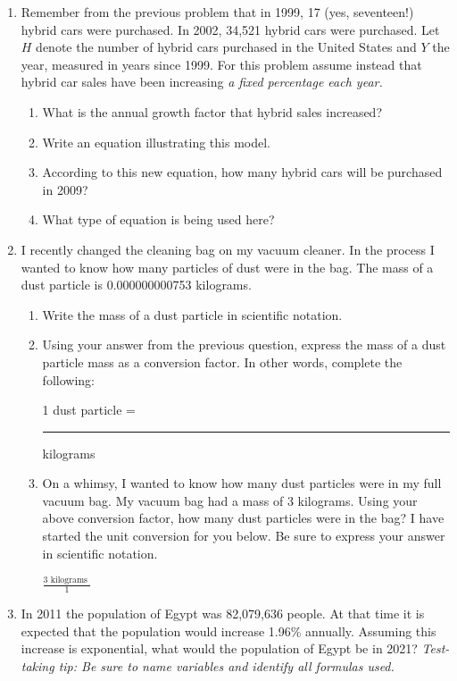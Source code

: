 \documentclass[12pt]{article}
\begin{document}
\begin{enumerate}
\newpage
\item  Remember from the previous problem that in 1999, 17 (yes, seventeen!) hybrid cars were purchased.  In 2002, 34,521 hybrid cars were purchased. Let $H$ denote the number of hybrid cars purchased in the United States and $Y$ the year, measured in years since 1999.  For this problem assume instead that hybrid car sales have been increasing \textit{a fixed percentage each year.}

\begin{enumerate}
\item What is the annual growth factor that hybrid sales increased?  
\vfill
\item Write an equation illustrating this model.
\vfill
\item According to this new equation, how many hybrid cars will be purchased in 2009?
\vfill
\item What type of equation is being used here?
\vfill
\end{enumerate}








\newpage
\item I recently changed the cleaning bag on my vacuum cleaner.  In the process I wanted to know how many particles of dust were in the bag.  The mass of a dust particle is 0.000000000753 kilograms.

\begin{enumerate}
\item Write the mass of a dust particle in scientific notation.
\vfill
\item Using your answer from the previous question, express the mass of a dust particle mass as a conversion factor.  In other words, complete the following:
\vspace{0.2in}
\begin{center} 1 dust particle = \rule{1.5in}{.01in} kilograms \end{center}
\vspace{0.2in}

\item On a whimsy, I wanted to know how many dust particles were in my full vacuum bag.  My vacuum bag had a mass of 3 kilograms. Using your above conversion factor,  how many dust particles were in the bag? I have started the unit conversion for you below. Be sure to express your answer in scientific notation.
\vspace{0.1in}

$ \displaystyle \frac{ 3 \mbox{ kilograms } }{1 }$

\vfill

\end{enumerate}
\item In 2011 the population of Egypt was 82,079,636 people.  At that time it is expected that the population would increase 1.96\% annually.  Assuming this increase is exponential, what would the population of Egypt be in 2021?  \emph{Test-taking tip: Be sure to name variables and identify all formulas used.}
\vfill


\end{enumerate}
\end{document}
